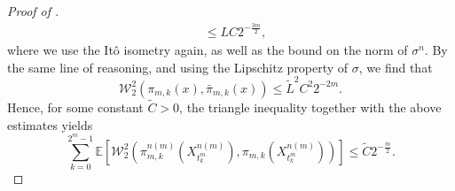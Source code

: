 \documentclass[12pt,oneside]{amsart}
\theoremstyle{definition}
\numberwithin{equation}{section}
\begin{document}
\begin{proof}[Proof of ]
\begin{align}
    \label{eq:prop_pi_n_m_convergence}
    &\le
    L C 2^{-\frac{3m}{2}},
\end{align}
where we use the It\^o isometry again, as well as the bound on the norm of $\sigma^n$. By the same line of reasoning, and using the Lipschitz property of $\sigma$, we find that
\begin{equation}\label{eq:wass-2-bound-sigma}
	\mathcal W_2^2(\pi_{m,k}(x), \bar \pi_{m,k}(x)) \leq \tilde L^2 C^2 2^{-2m}.
\end{equation}
Hence, for some constant $\tilde C > 0$, the triangle inequality together with the above estimates yields
\begin{equation}
    \label{eq:prop_sum_W2_vanishes}
    \sum_{k = 0}^{2^m - 1} \mathbb E \!\left[ \mathcal W_2^2\!\left(\pi^{n(m)}_{m,k}(X^{n(m)}_{t^m_k}), \pi_{m,k}(X^{n(m)}_{t^m_k})\right)\! \right]\! 
    \le
    \tilde C 2^{-\frac{m}{2}}.
\end{equation}


\end{proof}
\end{document}
